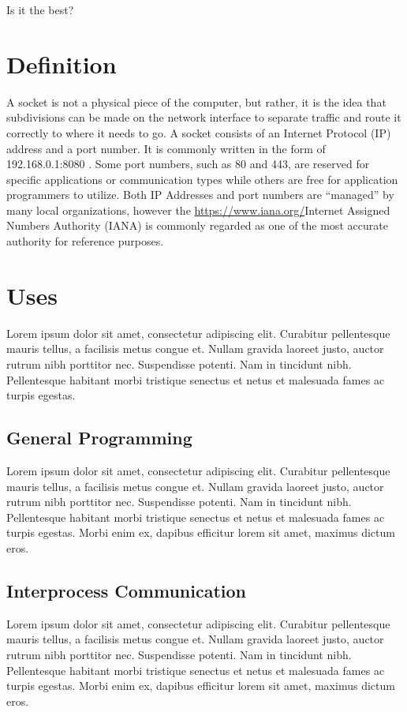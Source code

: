 \documentclass[conference, 12pt]{IEEEtran}
\begin{document}
Is it the best?


\section{Definition}
A socket is not a physical piece of the computer, but rather, it is the idea that subdivisions can be made on the network interface to separate traffic and route it correctly to where it needs to go. A socket consists of an Internet Protocol (IP) address and a port number. It is commonly written in the form of 192.168.0.1:8080 \cite{6}. Some port numbers, such as 80 and 443, are reserved for specific applications or communication types while others are free for application programmers to utilize. Both IP Addresses and port numbers are “managed” by many local organizations, however the \url{https://www.iana.org/}{Internet Assigned Numbers Authority} (IANA) is commonly regarded as one of the most accurate authority for reference purposes.

\section{Uses}
Lorem ipsum dolor sit amet, consectetur adipiscing elit. Curabitur pellentesque mauris tellus, a facilisis metus congue et. Nullam gravida laoreet justo, auctor rutrum nibh porttitor nec. Suspendisse potenti. Nam in tincidunt nibh. Pellentesque habitant morbi tristique senectus et netus et malesuada fames ac turpis egestas.

\subsection{General Programming}
Lorem ipsum dolor sit amet, consectetur adipiscing elit. Curabitur pellentesque mauris tellus, a facilisis metus congue et. Nullam gravida laoreet justo, auctor rutrum nibh porttitor nec. Suspendisse potenti. Nam in tincidunt nibh. Pellentesque habitant morbi tristique senectus et netus et malesuada fames ac turpis egestas. Morbi enim ex, dapibus efficitur lorem sit amet, maximus dictum eros.

\subsection{Interprocess Communication}
Lorem ipsum dolor sit amet, consectetur adipiscing elit. Curabitur pellentesque mauris tellus, a facilisis metus congue et. Nullam gravida laoreet justo, auctor rutrum nibh porttitor nec. Suspendisse potenti. Nam in tincidunt nibh. Pellentesque habitant morbi tristique senectus et netus et malesuada fames ac turpis egestas. Morbi enim ex, dapibus efficitur lorem sit amet, maximus dictum eros.
\end{document}
